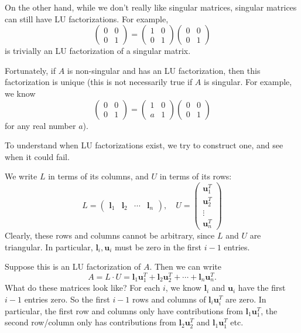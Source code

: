 \documentclass[a4paper]{article}
\begin{document}
On the other hand, while we don't really like singular matrices, singular matrices can still have LU factorizations. For example,
\[
  \begin{pmatrix}
    0 & 0\\
    0 & 1
  \end{pmatrix}
  =
  \begin{pmatrix}
    1 & 0\\
    0 & 1
  \end{pmatrix}
  \begin{pmatrix}
    0 & 0\\
    0 & 1
  \end{pmatrix}
\]
is trivially an LU factorization of a singular matrix.

Fortunately, if $A$ is non-singular and has an LU factorization, then this factorization is unique (this is not necessarily true if $A$ is singular. For example, we know
\[
  \begin{pmatrix}
    0 & 0\\
    0 & 1
  \end{pmatrix}
  =
  \begin{pmatrix}
    1 & 0\\
    a & 1
  \end{pmatrix}
  \begin{pmatrix}
    0 & 0\\
    0 & 1
  \end{pmatrix}
\]
for any real number $a$).

To understand when LU factorizations exist, we try to construct one, and see when it could fail.

We write $L$ in terms of its columns, and $U$ in terms of its rows:
\[
  L =
  \begin{pmatrix}
    \mathbf{l}_1 & \mathbf{l}_2 & \cdots & \mathbf{l}_n
  \end{pmatrix},
  \quad
  U =
  \begin{pmatrix}
    \mathbf{u}_1^T\\
    \mathbf{u}_2^T\\
    \vdots\\
    \mathbf{u}_n^T
  \end{pmatrix}
\]
Clearly, these rows and columns cannot be arbitrary, since $L$ and $U$ are triangular. In particular, $\mathbf{l}_i, \mathbf{u}_i$ must be zero in the first $i - 1$ entries.

Suppose this is an LU factorization of $A$. Then we can write
\[
  A = L\cdot U = \mathbf{l}_1 \mathbf{u}_1^T + \mathbf{l}_2 \mathbf{u}_2^T + \cdots + \mathbf{l}_n \mathbf{u}_n^T.
\]
What do these matrices look like? For each $i$, we know $\mathbf{l}_i$ and $\mathbf{u}_i$ have the first $i - 1$ entries zero. So the first $i - 1$ rows and columns of $\mathbf{l}_i \mathbf{u}_i^T$ are zero. In particular, the first row and columns only have contributions from $\mathbf{l}_1\mathbf{u}_1^T$, the second row/column only has contributions from $\mathbf{l}_2 \mathbf{u}_2^T$ and $\mathbf{l}_1 \mathbf{u}_1^T$ etc.
\end{document}
